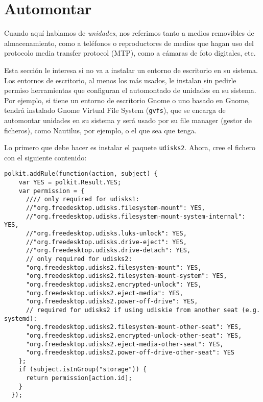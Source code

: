 \section{Automontar}\label{sec:automontar}
Cuando aquí hablamos de \emph{unidades}, nos referimos tanto a medios removibles de almacenamiento, como a
teléfonos o reproductores de medios que hagan uso del protocolo media transfer protocol (MTP), como a cámaras de
foto digitales, etc.

Esta sección le interesa si no va a instalar un entorno de escritorio en su sistema. Los entornos de escritorio,
al menos los más usados, le instalan sin pedirle permiso herramientas que configuran el automontado de unidades
en su sistema. Por ejemplo, si tiene un entorno de escritorio Gnome o uno basado en Gnome, tendrá instalado
Gnome Virtual File System (\lstinline!gvfs!), que se encarga de automontar unidades en su sistema y será usado
por su file manager (gestor de ficheros), como Nautilus, por ejemplo, o el que sea que tenga.

Lo primero que debe hacer es instalar el paquete \lstinline!udisks2!. Ahora, cree el fichero
 con el siguiente contenido:

\begin{lstlisting}[gobble=2,style=bashcode,escapechar=!]
  polkit.addRule(function(action, subject) {
    var YES = polkit.Result.YES;
    var permission = {
      //// only required for udisks1:
      //"org.freedesktop.udisks.filesystem-mount": YES,
      //"org.freedesktop.udisks.filesystem-mount-system-internal": YES,
      //"org.freedesktop.udisks.luks-unlock": YES,
      //"org.freedesktop.udisks.drive-eject": YES,
      //"org.freedesktop.udisks.drive-detach": YES,
      // only required for udisks2:
      "org.freedesktop.udisks2.filesystem-mount": YES,
      "org.freedesktop.udisks2.filesystem-mount-system": YES,
      "org.freedesktop.udisks2.encrypted-unlock": YES,
      "org.freedesktop.udisks2.eject-media": YES,
      "org.freedesktop.udisks2.power-off-drive": YES,
      // required for udisks2 if using udiskie from another seat (e.g. systemd):
      "org.freedesktop.udisks2.filesystem-mount-other-seat": YES,
      "org.freedesktop.udisks2.encrypted-unlock-other-seat": YES,
      "org.freedesktop.udisks2.eject-media-other-seat": YES,
      "org.freedesktop.udisks2.power-off-drive-other-seat": YES
    };
    if (subject.isInGroup("storage")) {
      return permission[action.id];
    }
  });
\end{lstlisting}

